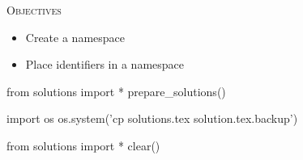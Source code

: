 
\textsc{Objectives}

\begin{itemize}
\item
  Create a namespace
\item
  Place identifiers in a namespace
\end{itemize}



\begin{python0}
from solutions import *
prepare_solutions()
\end{python0}
\begin{python}
import os
os.system('cp solutions.tex solution.tex.backup')  
\end{python}

\begin{python0}
from solutions import *
clear()
\end{python0}
